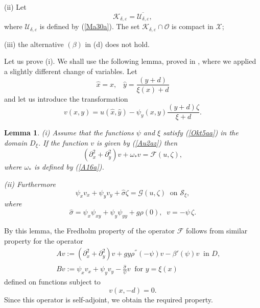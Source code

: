 \documentclass[a4paper,reqno,12pt]{amsart}
\theoremstyle{plain}
\newtheorem{lemma}[theorem]{Lemma}
\theoremstyle{definition}
\numberwithin{equation}{section}
\begin{document}
(ii) Let
$$
{\mathcal K}_{\delta,\varepsilon}=\overline{{\mathcal U}_{\delta,\varepsilon}},
$$
where ${\mathcal U}_{\delta,\varepsilon}$ is defined by (\ref{Ma30a}).
The set ${\mathcal K}_{\delta,\varepsilon}\cap {\mathcal O}$ is compact in ${\mathcal X}$;

(iii) the alternative $(\beta)$ in (d) does not hold.

\medskip
Let us prove (i). We shall use the following lemma, proved in \cite{KPOMI}, where we applied a slightly different change of variables. Let
$$
\hat{x}=x,\;\;\;\hat{y}=\frac{(y+d)}{\xi(x)+d}
$$
and
let us introduce the transformation
\begin{equation}\label{Au2az}
v(x,y)=u(\hat{x},\hat{y})-\psi_{y}(x,y)\frac{(y+d)\zeta}{\xi+d}.
\end{equation}

\begin{lemma} (i) Assume that the functions $\psi$ and $\xi$ satisfy (\ref{Okt5aa})
in the domain $D_\xi$. If the function  $v$ is given
by (\ref{Au2az}) then
$$
(\partial_x^2+\partial_y^2)v+\omega_*v={\mathcal F}(u,\zeta),
$$
where $\omega_*$ is defined by (\ref{A16a}).

(ii) Furthermore
$$
\psi_xv_x+\psi_yv_y+\hat{\sigma}\zeta={\mathcal G}(u,\zeta)\;\;
\mbox{on ${\mathcal S}_\xi$},
$$
where
$$
\hat{\sigma}=\psi_x\psi_{xy}+\psi_y\psi_{yy}+g\rho(0),\;\;v=-\psi\,\zeta.
$$

\end{lemma}

By this lemma, the Fredholm property of the operator ${\mathcal F}$  follows from similar property for the operator
\begin{eqnarray}\label{Se28b}
&&A v:=(\partial_x^2+\partial_y^2) v+gy\rho^{''}(-\psi)v-\beta' (\psi)v\;\;
\mbox{in $D$},\nonumber\\
&&B v:=\psi_xv_x+\psi_yv_y-\frac{\hat{\sigma}}{\psi}v\;\;
\mbox{for $y=\xi(x)$}
\end{eqnarray}
defined on functions subject to
\begin{equation}\label{Se28ad}
v(x,-d)=0.
\end{equation}
Since this operator is self-adjoint, we obtain the required property.
\end{document}
